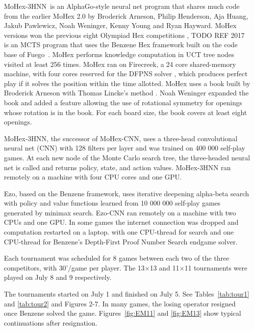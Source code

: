 \documentclass{IOS-Book-Article}
\def\Eo{\mbox{\sc Ezo}}
\def\Ec{\mbox{\sc Ezo-CNN}}
\def\Mx{\mbox{\sc MoHex}}
\def\Mc{\mbox{\sc MoHex-CNN}}
\def\Mt{\mbox{\sc MoHex-3HNN}}
\def\Fuego{\mbox{\sc Fuego}}
\begin{document}
\Mt\ is an AlphaGo-style neural net program that shares
much code from the earlier MoHex 2.0 by 
Broderick Arneson, Philip Henderson, Aja Huang, 
Jakub Pawlewicz, Noah Weninger, Kenny Young and Ryan Hayward.
MoHex versions
won the previous
eight Olympiad Hex competitions \cite{HAHP13},
TODO REF 2017
is an MCTS program that uses the Benzene Hex framework
built on the code base of \Fuego\ \cite{fuego}.
\Mx{} performs knowledge computation 
in UCT tree nodes visited at least 256 times.
\Mx{} ran on Firecreek, a 24 core shared-memory machine, 
with four cores reserved for the 
DFPNS solver \cite{PawlH13}, which
produces perfect play if it solves the
position within the time allotted.
\Mx{} uses a book built by Broderick Arneson with Thomas Lincke's method 
\cite{DBLP:conf/cg/Lincke00}. 
Noah Weninger expanded the book and added a feature
allowing the use of rotational symmetry for openings
whose rotation is in the book.
For each board size, the book covers at least eight openings.

\Mt{}, the successor of \Mc,
uses a three-head convolutional neural net (CNN)
with 128 filters per layer \cite{ijcai}
and was trained on 400 000 self-play games.
At each new node of the Monte Carlo search tree, 
the three-headed neural net is called
and returns policy, state, and action values.
\Mt{} ran remotely on a machine with four CPU cores and one GPU.

\Eo{}, based on the Benzene framework, 
uses iterative deepening alpha-beta search 
with policy and value functions
learned from 10 000 000 self-play games
generated by minimax search.
\Ec{} ran remotely on a machine
with two CPUs and one GPU.
In some games the internet connection was dropped
and computation restarted on a  laptop.
with one CPU-thread for search and one CPU-thread for
Benzene's Depth-First Proof Number Search endgame solver.

Each tournament was scheduled for 8 games between
each two of the three competitors, with 30'/game per player.
The 13$\times$13 and 11$\times$11 tournaments were played
on July 8 and 9 respectively.


The tournaments started on July 1 and finished on July 5.
See Tables~\ref{tab:tour1} and \ref{tab:tour2} and Figures 2-7.
In many games, the losing operator resigned once Benzene solved the game.
Figures~\ref{fig:EM11} and \ref{fig:EM13} show typical continuations
after resignation.
\end{document}
